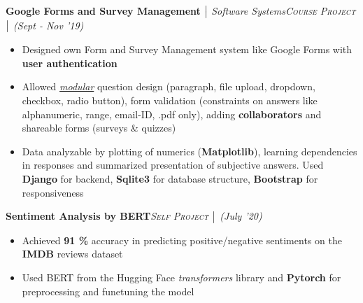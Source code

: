 \documentclass{article}
\begin{document}
\vspace{-5.25pt}
\textbf{Google Forms and Survey Management} $\bigm|$ {\it Software Systems}\hfill{\sl \small \textsc{Course Project} $\bigm|$ (Sept - Nov '19)}\\
\vspace{-18.5pt}
\begin{itemize}[itemsep = -1.25 mm, leftmargin=*]
    \item Designed own Form and Survey Management system like Google Forms with \textbf{user authentication}
    \item Allowed \textit{\underline{modular}} question design (paragraph, file upload, dropdown, checkbox, radio button), form validation (constraints\vspace{-0.2mm} on answers like alphanumeric, range, email-ID, .pdf only), adding \textbf{collaborators} and shareable forms (surveys \& quizzes)
    \item Data analyzable by plotting of numerics (\textbf{Matplotlib}), learning dependencies in responses and summarized presentation\vspace{-0.2mm} of subjective answers. Used \textbf{Django} for backend, \textbf{Sqlite3} for database structure, \textbf{Bootstrap} for responsiveness
\end{itemize}
\vspace{-5pt}
\textbf{Sentiment Analysis by BERT}\hfill{\sl \small \textsc{Self Project} $\bigm|$ (July '20)}\\
\vspace{-18.5pt}
\begin{itemize}[itemsep = -1.25 mm, leftmargin=*]
   \item Achieved {\bf 91 \%} accuracy in predicting positive/negative sentiments on the \textbf{IMDB} reviews dataset
    \item Used BERT from the Hugging Face {\it transformers} library and {\bf Pytorch} for preprocessing and funetuning the model
\end{itemize}
\end{document}

